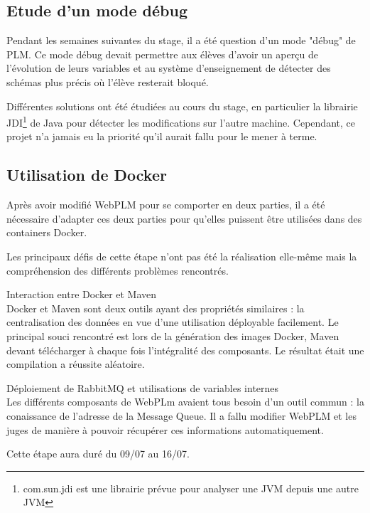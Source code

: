 \documentclass[stage]{tnreport}
\begin{document}
\subsection{Etude d'un mode débug}

Pendant les semaines suivantes du stage, il a été question d'un mode "débug" de PLM. Ce mode débug devait permettre aux élèves d'avoir un aperçu de l'évolution de leurs variables et au système d'enseignement de détecter des schémas plus précis où l'élève resterait bloqué.

Différentes solutions ont été étudiées au cours du stage, en particulier la librairie JDI\cite{JDI}\footnote{com.sun.jdi est une librairie prévue pour analyser une JVM depuis une autre JVM} de Java pour détecter les modifications sur l'autre machine. Cependant, ce projet n'a jamais eu la priorité qu'il aurait fallu pour le mener à terme.

\subsection{Utilisation de Docker}

Après avoir modifié WebPLM pour se comporter en deux parties, il a été nécessaire d'adapter ces deux parties pour qu'elles puissent être utilisées dans des containers Docker.

Les principaux défis de cette étape n'ont pas été la réalisation elle-même mais la compréhension des différents problèmes rencontrés.

\begin{description}
	\item{Interaction entre Docker et Maven} \hfill \\
		Docker et Maven sont deux outils ayant des propriétés similaires : la centralisation des données en vue d'une utilisation déployable facilement. Le principal souci rencontré est lors de la génération des images Docker, Maven devant télécharger à chaque fois l'intégralité des composants. Le résultat était une compilation a réussite aléatoire.
	\item{Déploiement de RabbitMQ et utilisations de variables internes} \hfill \\
		Les différents composants de WebPLm avaient tous besoin d'un outil commun : la conaissance de l'adresse de la Message Queue. Il a fallu modifier WebPLM et les juges de manière à pouvoir récupérer ces informations automatiquement.
\end{description}

Cette étape aura duré du 09/07 au 16/07.
\end{document}

